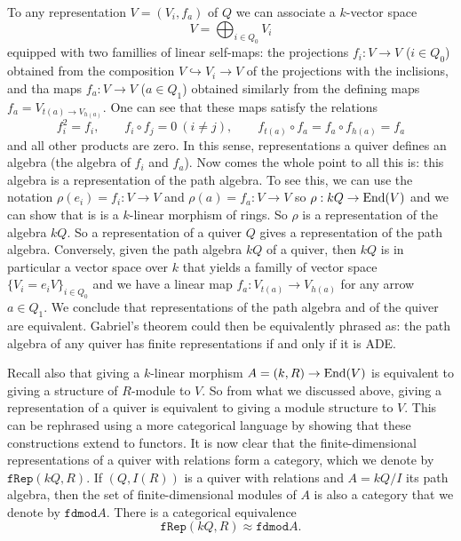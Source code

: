         To any representation $V=(V_i,f_a)$ of $Q$ we can associate a $k$-vector space
        \begin{equation}
            V=\bigoplus_{i \in Q_0}V_i
        \end{equation}
        equipped with two famillies of linear self-maps: the projections $f_i:V\to V$ ($i\in Q_0$) obtained from the composition $V\hookrightarrow V_i\to V$ of the projections with the inclisions, and tha maps $f_a:V\to V$ ($a\in Q_1$) obtained similarly from the defining maps $f_a=V_{t(a)\to V_{h(a)}}$. One can see that these maps satisfy the relations
        \begin{equation}
            f^2_i=f_i,\qquad f_i\circ f_j=0~(i\neq j),\qquad f_{t(a)}\circ f_a=f_a\circ f_{h(a)}=f_a
        \end{equation}
        and all other products are zero. In this sense, representations a quiver defines an algebra (the algebra of $f_i$ and $f_a$). Now comes the whole point to all this is: this algebra is a representation of the path algebra. To see this, we can use the notation $\rho(e_i)=f_i:V\to V$ and $\rho(a)=f_a:V\to V$ so $\rho:kQ\to \text{End}(V)$ and we can show that is is a $k$-linear morphism of rings. So $\rho$ is a representation of the algebra $kQ$. So a representation of a quiver $Q$ gives a representation of the path algebra. Conversely, given the path algebra $kQ$ of a quiver, then $kQ$ is in particular a vector space over $k$ that yields a familly of vector space $\{V_i=e_i V\}_{i\in Q_0}$ and we have a linear map $f_a:V_{t(a)}\to V_{h(a)}$ for any arrow $a\in Q_1$. We conclude that representations of the path algebra and of the quiver are equivalent. Gabriel's theorem could then be equivalently phrased as: the path algebra of any quiver has finite representations if and only if it is ADE.
        
        Recall also that giving a $k$-linear morphism $A=(k,R)\to\text{End}(V)$ is equivalent to giving a structure of $R$-module to $V$. So from what we discussed above, giving a representation of a quiver is equivalent to giving a module structure to $V$. This can be rephrased using a more categorical language by showing that these constructions extend to functors. It is now clear that the finite-dimensional representations of a quiver with relations form a category, which we denote by $\texttt{fRep}(kQ,R)$. If $(Q,I(R))$ is a quiver with relations and $A=kQ/I$ its path algebra, then the set of finite-dimensional modules of $A$ is also a category that we denote by $\texttt{fdmod}A$. There is a categorical equivalence
        \begin{equation}
            \boxed{\texttt{fRep}(kQ,R)\approx\texttt{fdmod}A.}
        \end{equation}

